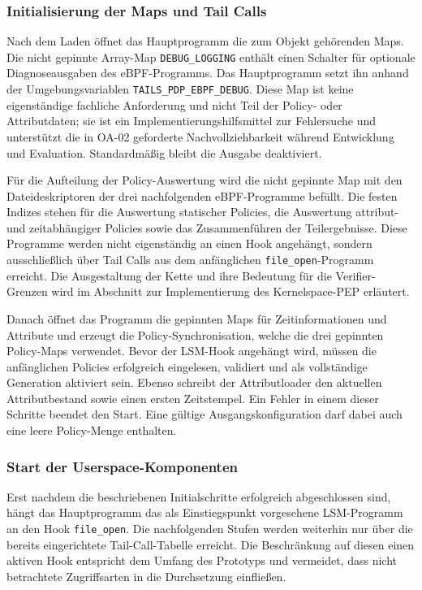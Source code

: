 \subsubsection{Initialisierung der Maps und Tail Calls}
Nach dem Laden öffnet das Hauptprogramm die zum Objekt gehörenden Maps. Die nicht gepinnte Array-Map \texttt{DEBUG\_LOGGING} enthält einen Schalter für optionale Diagnoseausgaben des eBPF-Programms. Das Hauptprogramm setzt ihn anhand der Umgebungsvariablen \texttt{TAILS\_PDP\_EBPF\_DEBUG}. Diese Map ist keine eigenständige fachliche Anforderung und nicht Teil der Policy- oder Attributdaten; sie ist ein Implementierungshilfsmittel zur Fehlersuche und unterstützt die in OA-02 geforderte Nachvollziehbarkeit während Entwicklung und Evaluation. Standardmäßig bleibt die Ausgabe deaktiviert.

Für die Aufteilung der Policy-Auswertung wird die nicht gepinnte Map  mit den Dateideskriptoren der drei nachfolgenden eBPF-Programme befüllt. Die festen Indizes stehen für die Auswertung statischer Policies, die Auswertung attribut- und zeitabhängiger Policies sowie das Zusammenführen der Teilergebnisse. Diese Programme werden nicht eigenständig an einen Hook angehängt, sondern ausschließlich über Tail Calls aus dem anfänglichen \texttt{file\_open}-Programm erreicht. Die Ausgestaltung der Kette und ihre Bedeutung für die Verifier-Grenzen wird im Abschnitt zur Implementierung des Kernelspace-PEP erläutert.

Danach öffnet das Programm die gepinnten Maps für Zeitinformationen und Attribute und erzeugt die Policy-Synchronisation, welche die drei gepinnten Policy-Maps verwendet. Bevor der LSM-Hook angehängt wird, müssen die anfänglichen Policies erfolgreich eingelesen, validiert und als vollständige Generation aktiviert sein. Ebenso schreibt der Attributloader den aktuellen Attributbestand sowie einen ersten Zeitstempel. Ein Fehler in einem dieser Schritte beendet den Start. Eine gültige Ausgangskonfiguration darf dabei auch eine leere Policy-Menge enthalten.

\subsubsection{Start der Userspace-Komponenten}
Erst nachdem die beschriebenen Initialschritte erfolgreich abgeschlossen sind, hängt das Hauptprogramm das als Einstiegspunkt vorgesehene LSM-Programm an den Hook \texttt{file\_open}. Die nachfolgenden Stufen werden weiterhin nur über die bereits eingerichtete Tail-Call-Tabelle erreicht. Die Beschränkung auf diesen einen aktiven Hook entspricht dem Umfang des Prototyps und vermeidet, dass nicht betrachtete Zugriffsarten in die Durchsetzung einfließen.


